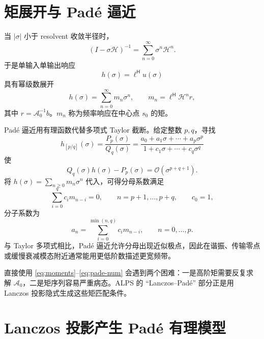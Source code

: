 \documentclass[UTF8,a4paper,11pt]{ctexart}
\newcommand{\cA}{\mathcal{A}}
\newcommand{\cH}{\mathcal{H}}
\newcommand{\cO}{\mathcal{O}}
\newcommand{\herm}{\mathsf{H}}
\begin{document}
\section{矩展开与 Padé 逼近}

当 $|\sigma|$ 小于 resolvent 收敛半径时，
\begin{equation}
    (I-\sigma\cH)^{-1}
    =
    \sum_{n=0}^{\infty}\sigma^n\cH^n .
\end{equation}
于是单输入单输出响应
\begin{equation}
    h(\sigma)=\ell^{\herm}u(\sigma)
\end{equation}
具有幂级数展开
\begin{equation}
    h(\sigma)
    =
    \sum_{n=0}^{\infty}m_n\sigma^n,
    \qquad
    m_n=\ell^{\herm}\cH^n r,
    \label{eq:moments}
\end{equation}
其中 $r=\cA_0^{-1}b$。$m_n$ 称为频率响应在中心点 $s_0$ 的矩。

Padé 逼近用有理函数代替多项式 Taylor 截断。给定整数 $p,q$，寻找
\begin{equation}
    h_{[p/q]}(\sigma)
    =
    \frac{P_p(\sigma)}{Q_q(\sigma)}
    =
    \frac{a_0+a_1\sigma+\cdots+a_p\sigma^p}
    {1+c_1\sigma+\cdots+c_q\sigma^q}
    \label{eq:pade}
\end{equation}
使
\begin{equation}
    Q_q(\sigma)h(\sigma)-P_p(\sigma)
    =\cO(\sigma^{p+q+1}).
    \label{eq:pade-condition}
\end{equation}
将 $h(\sigma)=\sum_{n\ge0}m_n\sigma^n$ 代入，可得分母系数满足
\begin{equation}
    \sum_{i=0}^{q}c_i m_{n-i}=0,
    \qquad
    n=p+1,\ldots,p+q,
    \qquad c_0=1,
    \label{eq:pade-den}
\end{equation}
分子系数为
\begin{equation}
    a_n=\sum_{i=0}^{\min(n,q)}c_i m_{n-i},
    \qquad n=0,\ldots,p .
    \label{eq:pade-num}
\end{equation}
与 Taylor 多项式相比，Padé 逼近允许分母出现近似极点，因此在谐振、传输零点或缓慢衰减模态附近通常能用更低阶数描述更宽频带。

直接使用 \eqref{eq:moments}--\eqref{eq:pade-num} 会遇到两个困难：一是高阶矩需要反复求解 $\cA_0$，二是矩序列容易严重病态。ALPS 的 ``Lanczos--Padé'' 部分正是用 Lanczos 投影隐式生成这些矩匹配条件。

\section{Lanczos 投影产生 Padé 有理模型}
\end{document}
